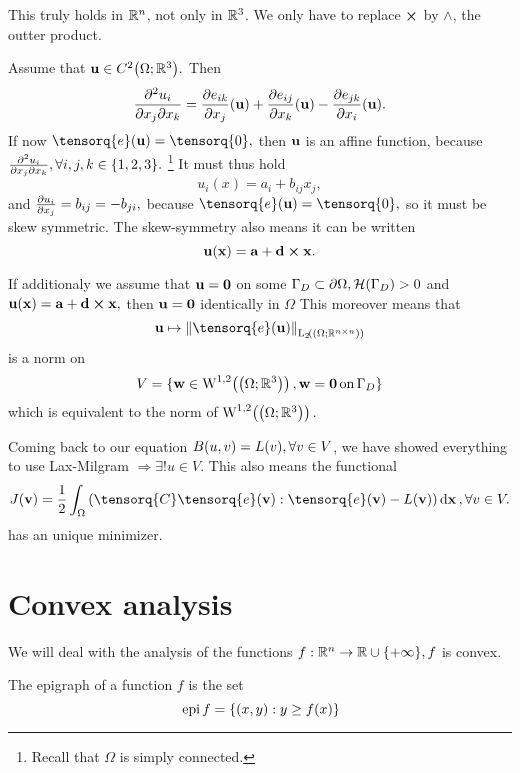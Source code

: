 \documentclass[reqno, a4paper]{article}
\begin{document}
\begin{remark}[$\R^n$]
    This truly holds in $\R^n$, not only in ${\mathbb R}^3$. We only have to replace $\cross$ by $\wedge$, the outter product.
\end{remark}

Assume that $\vb{u} \in C^2\qty(\Omega ; {\mathbb R}^3).$ Then
\[
	\pdv[2]{u_i}{x_j}{x_k} = \pdv{e_{ik}}{x_j}\qty(\vb{u}) + \pdv{e_{ij}}{x_k}\qty(\vb{u}) - \pdv{e_{jk}}{x_i}\qty(\vb{u}).
\]
If now $\tensorq{e}\qty(\vb{u}) = \tensorq{0}, $ then $\vb{u}$ is an affine function, because $\pdv[2]{u_i}{x_j}{x_k}, \forall i,j,k \in \{1, 2, 3\}.$ \footnote{Recall that $\Omega$ is simply connected.} It must thus hold
\[
	u_i(x) = a_i + b_{ij}x_j,
\]
and $\pdv{u_i}{x_j} = b_{ij} = - b_{ji},$ because $\tensorq{e}\qty(\vb{u}) = \tensorq{0},$ so it must be skew symmetric. The skew-symmetry also means it can be written
\[
	\vb{u}\qty(\vb{x}) = \vb{a} + \vb{d} \cross \vb{x}.
\]

If additionaly we assume that $\vb{u} = \vb{0}$ on some $\Gamma_D \subset \partial \Omega, \mathcal{H}\qty(\Gamma_{D})>0$ and $\vb{u}\qty(\vb{x}) = \vb{a}+ \vb{d} \cross \vb{x},$ then $\vb{u} = \vb{0}$ identically in $\Omega$
This moreover means that
\[
	\vb{u} \mapsto \norm{\tensorq{e}\qty(\vb{u})}_{\LpSet[2]{\qty(\Omega; \R^{n \times n})}}
\]
is a norm on
\[
	V = \{ \vb{w} \in \WkpSet[1][2]{\qty(\Omega; \R^3)}, \vb{w} = \vb{0} \, \text{on} \, \Gamma_D \}
\]
which is equivalent to the norm of $\WkpSet[1][2]{\qty(\Omega; \R^3)}.$

Coming back to our equation $B\qty(u,v) = L(v), \forall v \in V$, we have showed everything to use Lax-Milgram $\Rightarrow \exists ! u \in V.$ This also means the functional
\[
	J(\vb{v}) = \frac{1}{2} \int_{\Omega}\qty(\tensorq{C}\tensorq{e}\qty(\vb{v}) :\tensorq{e}\qty(\vb{v})-L\qty(\vb{v}))\dd{\vb{x}}, \forall v \in V.
\]
has an unique minimizer.

\section{Convex analysis}
\label{sec:convex_analysis}

We will deal with the analysis of the functions $f: {\mathbb R}^n \to {\mathbb R} \cup \{+ \infty \}, f$ is convex.

\begin{definition}
	The epigraph of a function $f$ is the set
	\[
		\, \text{epi} \, f = \{\qty(x,y): y \geq f(x) \}
	\]
\end{definition}
\end{document}
